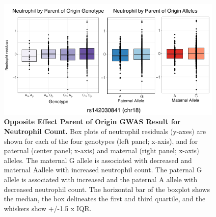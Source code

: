 \begin{figure}[!htb]
\centering
\includegraphics[width=5in]{img/ch02/fig-s14.pdf}
\caption[Opposite Effect Parent of Origin GWAS Result for Neutrophil Count.]{\textbf{Opposite Effect Parent of Origin GWAS Result for Neutrophil Count.}  Box plots of neutrophil residuals (y-axes) are shown for each of the four genotypes (left panel; x-axis), and for paternal (center panel; x-axis) and maternal (right panel; x-axis) alleles. The maternal G allele is associated with decreased and maternal Aallele with increased neutrophil count. The paternal G allele is associated with increased and the paternal A allele with decreased neutrophil count. The horizontal bar of the boxplot shows the median, the box delineates the first and third quartile, and the whiskers show +/-1.5 x IQR.}
\label{fig:fig-s14}
\end{figure}






